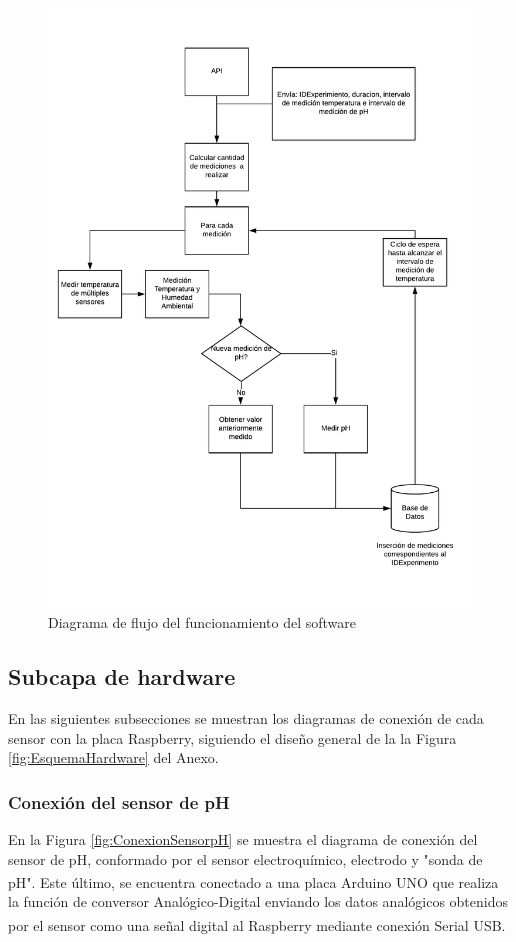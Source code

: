         \begin{figure}
        \centering
            \includegraphics[scale=0.75]{hardware/DiagramadeFlujoPython.pdf}
            \caption{Diagrama de flujo del funcionamiento del software }
            \label{FlujoPython}
        \end{figure}

    \subsection{Subcapa de hardware}
        \par En las siguientes subsecciones se muestran los diagramas de conexión de cada sensor con la placa Raspberry, siguiendo el diseño general de la la Figura \ref{fig:EsquemaHardware} del Anexo.

    \subsubsection{Conexión del sensor de pH}
        \par En la Figura \ref{fig:ConexionSensorpH} se muestra el diagrama de conexión del sensor de pH, conformado por el sensor electroquímico, electrodo y "sonda de pH". Este último, se encuentra conectado a una placa Arduino\textsuperscript{\textregistered} UNO que realiza la función de conversor Analógico-Digital enviando los datos analógicos obtenidos por el sensor como una señal digital al Raspberry\textsuperscript{\textregistered} mediante conexión Serial USB.
        
